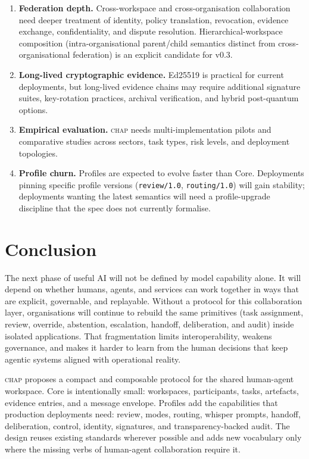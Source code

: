 \documentclass[11pt]{article}
\newcommand{\chap}{\textsc{chap}}
\begin{document}
\begin{enumerate}[leftmargin=*]
    \item \textbf{Federation depth.} Cross-workspace and cross-organisation collaboration need deeper treatment of identity, policy translation, revocation, evidence exchange, confidentiality, and dispute resolution. Hierarchical-workspace composition (intra-organisational parent/child semantics distinct from cross-organisational federation) is an explicit candidate for v0.3.

    \item \textbf{Long-lived cryptographic evidence.} Ed25519 is practical for current deployments, but long-lived evidence chains may require additional signature suites, key-rotation practices, archival verification, and hybrid post-quantum options.

    \item \textbf{Empirical evaluation.} \chap{} needs multi-implementation pilots and comparative studies across sectors, task types, risk levels, and deployment topologies.

    \item \textbf{Profile churn.} Profiles are expected to evolve faster than Core. Deployments pinning specific profile versions (\texttt{review/1.0}, \texttt{routing/1.0}) will gain stability; deployments wanting the latest semantics will need a profile-upgrade discipline that the spec does not currently formalise.
\end{enumerate}

\section{Conclusion}
\label{sec:conclusion}

The next phase of useful AI will not be defined by model capability alone. It will depend on whether humans, agents, and services can work together in ways that are explicit, governable, and replayable. Without a protocol for this collaboration layer, organisations will continue to rebuild the same primitives (task assignment, review, override, abstention, escalation, handoff, deliberation, and audit) inside isolated applications. That fragmentation limits interoperability, weakens governance, and makes it harder to learn from the human decisions that keep agentic systems aligned with operational reality.

\chap{} proposes a compact and composable protocol for the shared human-agent workspace. Core is intentionally small: workspaces, participants, tasks, artefacts, evidence entries, and a message envelope. Profiles add the capabilities that production deployments need: review, modes, routing, whisper prompts, handoff, deliberation, control, identity, signatures, and transparency-backed audit. The design reuses existing standards wherever possible and adds new vocabulary only where the missing verbs of human-agent collaboration require it.
\end{document}
